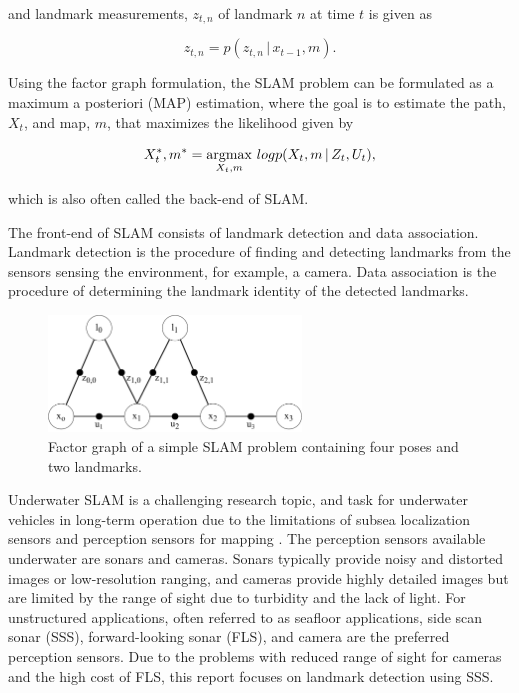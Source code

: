 and landmark measurements, $z_{t,n}$ of landmark $n$ at time $t$ is given as

\begin{equation}
    z_{t,n} = p(z_{t,n} \,|\, x_{t-1},m).
    \label{eq:landmark_measurement_pdf}
\end{equation}

Using the factor graph formulation, the SLAM problem can be formulated as a maximum a posteriori (MAP) estimation, where the goal is to estimate the path, $X_t$, and map, $m$, that maximizes the likelihood given by

\begin{equation}
    X_t^*, m^* = \operatorname*{argmax}_{X_t,m} \, logp(X_t,m \,|\, Z_t,U_t),
    \label{eq:SLAM}
\end{equation}

which is also often called the back-end of SLAM.

The front-end of SLAM consists of landmark detection and data association. Landmark detection is the procedure of finding and detecting landmarks from the sensors sensing the environment, for example, a camera.  Data association is the procedure of determining the landmark identity of the detected landmarks.

\begin{figure} [t]
    \centering
    \includegraphics[width=0.6\textwidth]{figures/factor_graph.drawio.pdf}
    \caption{Factor graph of a simple SLAM problem containing four poses and two landmarks.}
    \label{fig:factor_graph}
\end{figure}


Underwater SLAM is a challenging research topic, and task for underwater vehicles in long-term operation due to the limitations of subsea localization sensors and perception sensors for mapping \cite{Hidalgo2015ReviewTechniques}. The perception sensors available underwater are sonars and cameras. Sonars typically provide noisy and distorted images or low-resolution ranging, and cameras provide highly detailed images but are limited by the range of sight due to turbidity and the lack of light. For unstructured applications, often referred to as seafloor applications, side scan sonar (SSS), forward-looking sonar (FLS), and camera are the preferred perception sensors. Due to the problems with reduced range of sight for cameras and the high cost of FLS, this report focuses on landmark detection using SSS.

